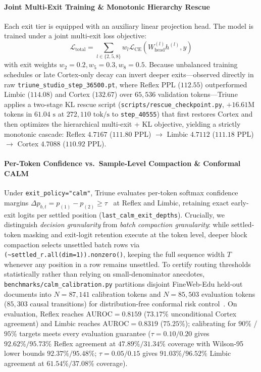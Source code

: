 \documentclass[10pt,twocolumn,letterpaper]{article}
\begin{document}
\paragraph{Joint Multi-Exit Training \& Monotonic Hierarchy Rescue} Each exit tier is equipped with an auxiliary linear projection head. The model is trained under a joint multi-exit loss objective:
\begin{equation}
    \mathcal{L}_{\text{total}} = \sum_{l \in \{2, 5, 8\}} w_l \mathcal{L}_{\text{CE}}(W_{\text{head}}^{(l)} h^{(l)}, y)
\end{equation}
with exit weights $w_2 = 0.2, w_5 = 0.3, w_8 = 0.5$. Because unbalanced training schedules or late Cortex-only decay can invert deeper exits---observed directly in raw \texttt{triune\_studio\_step\_36500.pt}, where Reflex PPL ($112.55$) outperformed Limbic ($114.08$) and Cortex ($132.67$) over $65,536$ validation tokens---Triune applies a two-stage KL rescue script (\texttt{scripts/rescue\_checkpoint.py}, $+16.61\text{M}$ tokens in $61.04\text{ s}$ at $272,110\text{ tok/s}$ to \texttt{step\_40555}) that first restores Cortex and then optimizes the hierarchical multi-exit + KL objective, yielding a strictly monotonic cascade: Reflex $4.7167$ ($111.80$ PPL) $\to$ Limbic $4.7112$ ($111.18$ PPL) $\to$ Cortex $4.7088$ ($110.92$ PPL).

\paragraph{Per-Token Confidence vs.\ Sample-Level Compaction \& Conformal CALM} Under \texttt{exit\_policy="calm"}, Triune evaluates per-token softmax confidence margins $\Delta p_{b,t} = p_{(1)} - p_{(2)} \ge \tau$~\cite{schuster2022confident} at Reflex and Limbic, retaining exact early-exit logits per settled position (\texttt{last\_calm\_exit\_depths}). Crucially, we distinguish \emph{decision granularity} from \emph{batch compaction granularity}: while settled-token masking and exit-logit retention execute at the token level, deeper block compaction selects unsettled batch rows via \texttt{(\textasciitilde settled\_r.all(dim=1)).nonzero()}, keeping the full sequence width $T$ whenever any position in a row remains unsettled. To certify routing thresholds statistically rather than relying on small-denominator anecdotes, \texttt{benchmarks/calm\_calibration.py} partitions disjoint FineWeb-Edu held-out documents into $N=87,141$ calibration tokens and $N=85,503$ evaluation tokens ($85,303$ causal transitions) for distribution-free conformal risk control~\cite{angelopoulos2021gentle,wilson1927probable}. On evaluation, Reflex reaches $\text{AUROC}=0.8159$ ($73.17\%$ unconditional Cortex agreement) and Limbic reaches $\text{AUROC}=0.8319$ ($75.25\%$); calibrating for $90\%$ / $95\%$ targets meets every evaluation guarantee ($\tau=0.10/0.20$ gives $92.62\%/95.73\%$ Reflex agreement at $47.89\%/31.34\%$ coverage with Wilson-95 lower bounds $92.37\%/95.48\%$; $\tau=0.05/0.15$ gives $91.03\%/96.52\%$ Limbic agreement at $61.54\%/37.08\%$ coverage).
\end{document}
